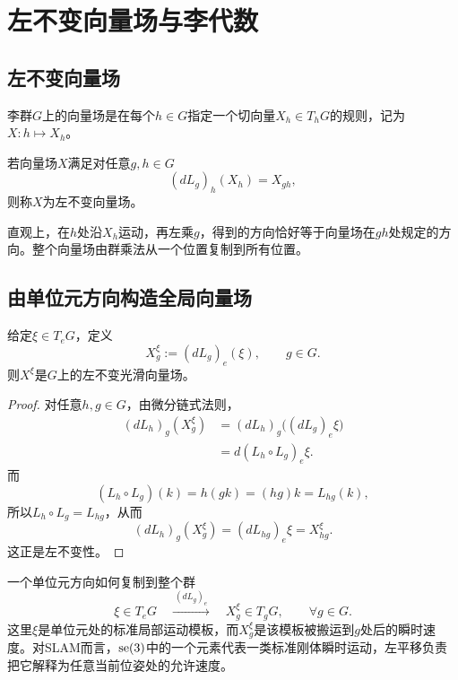 
\section{左不变向量场与李代数}

\subsection{左不变向量场}

\begin{definition}[向量场]
李群$G$上的向量场是在每个$h\in G$指定一个切向量$X_h\in T_hG$的规则，记为$X:h\mapsto X_h$。
\end{definition}

\begin{definition}[左不变向量场]
若向量场$X$满足对任意$g,h\in G$
\[
    (dL_g)_h(X_h)=X_{gh},
\]
则称$X$为左不变向量场。
\end{definition}

直观上，在$h$处沿$X_h$运动，再左乘$g$，得到的方向恰好等于向量场在$gh$处规定的方向。整个向量场由群乘法从一个位置复制到所有位置。

\subsection{由单位元方向构造全局向量场}

\begin{proposition}[单位元切向量生成左不变向量场]
给定$\xi\in T_eG$，定义
\[
    X^\xi_g:=(dL_g)_e(\xi),
    \qquad g\in G.
\]
则$X^\xi$是$G$上的左不变光滑向量场。
\end{proposition}

\begin{proof}
对任意$h,g\in G$，由微分链式法则，
\[
\begin{aligned}
    (dL_h)_g(X^\xi_g)
    &=(dL_h)_g\bigl((dL_g)_e\xi\bigr)\\
    &=d(L_h\circ L_g)_e\xi.
\end{aligned}
\]
而
\[
    (L_h\circ L_g)(k)=h(gk)=(hg)k=L_{hg}(k),
\]
所以$L_h\circ L_g=L_{hg}$，从而
\[
    (dL_h)_g(X^\xi_g)=(dL_{hg})_e\xi=X^\xi_{hg}.
\]
这正是左不变性。
\end{proof}

\begin{lieexample}{一个单位元方向如何复制到整个群}
\[
    \xi\in T_eG
    \quad\xrightarrow{\ (dL_g)_e\ }\quad
    X^\xi_g\in T_gG,
    \qquad\forall g\in G.
\]
这里$\xi$是单位元处的标准局部运动模板，而$X^\xi_g$是该模板被搬运到$g$处后的瞬时速度。对SLAM而言，$\operatorname{se}(3)$中的一个元素代表一类标准刚体瞬时运动，左平移负责把它解释为任意当前位姿处的允许速度。
\end{lieexample}

